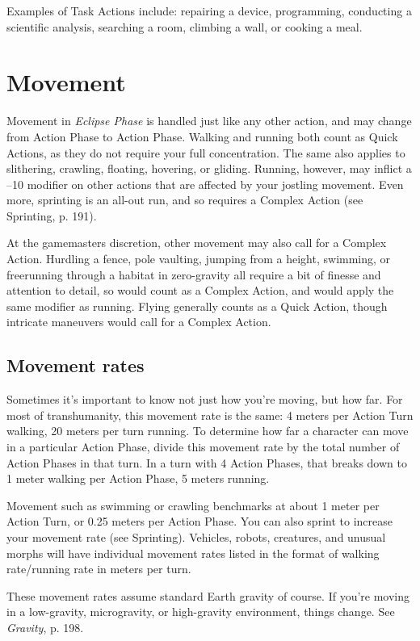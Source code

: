 Examples of Task Actions include: repairing a device, programming, conducting a scientific analysis, searching a room, climbing a wall, or cooking a meal.


\section{Movement}
\label{sec:movement}

Movement in \emph{Eclipse Phase} is handled just like any other action, and may change from Action Phase to Action Phase. Walking and running both count as Quick Actions, as they do not require your full concentration. The same also applies to slithering, crawling, floating, hovering, or gliding. Running, however, may inflict a –10 modifier on other actions that are affected by your jostling movement. Even more, sprinting is an all-out run, and so requires a Complex Action (see Sprinting, p. 191).

At the gamemasters discretion, other movement may also call for a Complex Action. Hurdling a fence, pole vaulting, jumping from a height, swimming, or freerunning through a habitat in zero-gravity all require a bit of finesse and attention to detail, so would count as a Complex Action, and would apply the same modifier as running. Flying generally counts as a Quick Action, though intricate maneuvers would call for a Complex Action.


\subsection{Movement rates}
\label{sec:movement-rates}

Sometimes it’s important to know not just how you’re moving, but how far. For most of transhumanity, this movement rate is the same: 4 meters per Action Turn walking, 20 meters per turn running. To determine how far a character can move in a particular Action Phase, divide this movement rate by the total number of Action Phases in that turn. In a turn with 4 Action Phases, that breaks down to 1 meter walking per Action Phase, 5 meters running.

Movement such as swimming or crawling benchmarks at about 1 meter per Action Turn, or 0.25 meters per Action Phase. You can also sprint to increase your movement rate (see Sprinting). Vehicles, robots, creatures, and unusual morphs will have individual movement rates listed in the format of walking rate/running rate in meters per turn.

These movement rates assume standard Earth gravity of course. If you’re moving in a low-gravity, microgravity, or high-gravity environment, things change. See \emph{Gravity}, p. 198.


